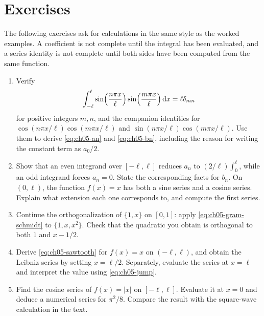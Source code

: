 \section*{Exercises}
The following exercises ask for calculations in the same style as the worked examples. A coefficient is not complete until the integral has been evaluated, and a series identity is not complete until both sides have been computed from the same function.

\renewcommand{\theenumi}{\thechapter.\arabic{enumi}}
\renewcommand{\labelenumi}{\theenumi.}
\begin{enumerate}
    \item\label{ex:fourier-orthogonality} Verify
    \begin{equation*}
        \int_{-\ell}^{\ell}\sin\Bigl(\frac{n\pi x}{\ell}\Bigr)\sin\Bigl(\frac{m\pi x}{\ell}\Bigr)\,\mathrm{d}x=\ell\delta_{mn}
    \end{equation*}
    for positive integers $m,n$, and the companion identities for $\cos(n\pi x/\ell)\cos(m\pi x/\ell)$ and $\sin(n\pi x/\ell)\cos(m\pi x/\ell)$. Use them to derive \eqref{eq:ch05-an} and \eqref{eq:ch05-bn}, including the reason for writing the constant term as $a_0/2$.

    \item\label{ex:fourier-even-odd} Show that an even integrand over $[-\ell,\ell]$ reduces $a_n$ to $(2/\ell)\int_0^{\ell}$, while an odd integrand forces $a_n=0$. State the corresponding facts for $b_n$. On $(0,\ell)$, the function $f(x)=x$ has both a sine series and a cosine series. Explain what extension each one corresponds to, and compute the first series.

    \item\label{ex:gram-schmidt-quadratic} Continue the orthogonalization of $\{1,x\}$ on $[0,1]$: apply \eqref{eq:ch05-gram-schmidt} to $\{1,x,x^2\}$. Check that the quadratic you obtain is orthogonal to both $1$ and $x-1/2$.

    \item\label{ex:fourier-sawtooth} Derive \eqref{eq:ch05-sawtooth} for $f(x)=x$ on $(-\ell,\ell)$, and obtain the Leibniz series by setting $x=\ell/2$. Separately, evaluate the series at $x=\ell$ and interpret the value using \eqref{eq:ch05-jump}.

    \item\label{ex:cosine-abs} Find the cosine series of $f(x)=|x|$ on $[-\ell,\ell]$. Evaluate it at $x=0$ and deduce a numerical series for $\pi^2/8$. Compare the result with the square-wave calculation in the text.


\end{enumerate}
